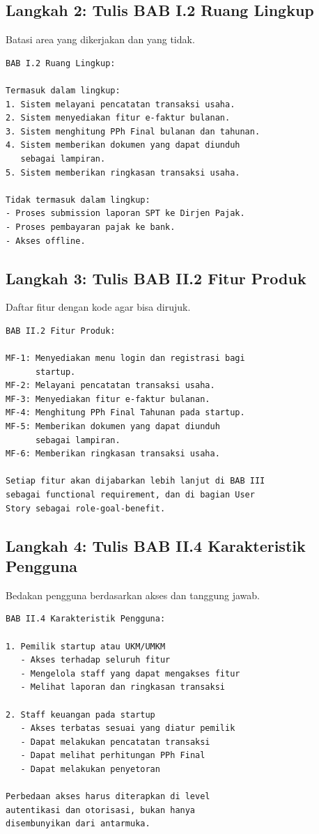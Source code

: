 \documentclass[11pt,a4paper]{article}
\begin{document}
\subsection{Langkah 2: Tulis BAB I.2 Ruang Lingkup}

Batasi area yang dikerjakan dan yang tidak.

\begin{lstlisting}[style=out]
BAB I.2 Ruang Lingkup:

Termasuk dalam lingkup:
1. Sistem melayani pencatatan transaksi usaha.
2. Sistem menyediakan fitur e-faktur bulanan.
3. Sistem menghitung PPh Final bulanan dan tahunan.
4. Sistem memberikan dokumen yang dapat diunduh
   sebagai lampiran.
5. Sistem memberikan ringkasan transaksi usaha.

Tidak termasuk dalam lingkup:
- Proses submission laporan SPT ke Dirjen Pajak.
- Proses pembayaran pajak ke bank.
- Akses offline.
\end{lstlisting}

\subsection{Langkah 3: Tulis BAB II.2 Fitur Produk}

Daftar fitur dengan kode agar bisa dirujuk.

\begin{lstlisting}[style=out]
BAB II.2 Fitur Produk:

MF-1: Menyediakan menu login dan registrasi bagi
      startup.
MF-2: Melayani pencatatan transaksi usaha.
MF-3: Menyediakan fitur e-faktur bulanan.
MF-4: Menghitung PPh Final Tahunan pada startup.
MF-5: Memberikan dokumen yang dapat diunduh
      sebagai lampiran.
MF-6: Memberikan ringkasan transaksi usaha.

Setiap fitur akan dijabarkan lebih lanjut di BAB III
sebagai functional requirement, dan di bagian User
Story sebagai role-goal-benefit.
\end{lstlisting}

\subsection{Langkah 4: Tulis BAB II.4 Karakteristik Pengguna}

Bedakan pengguna berdasarkan akses dan tanggung jawab.

\begin{lstlisting}[style=out]
BAB II.4 Karakteristik Pengguna:

1. Pemilik startup atau UKM/UMKM
   - Akses terhadap seluruh fitur
   - Mengelola staff yang dapat mengakses fitur
   - Melihat laporan dan ringkasan transaksi

2. Staff keuangan pada startup
   - Akses terbatas sesuai yang diatur pemilik
   - Dapat melakukan pencatatan transaksi
   - Dapat melihat perhitungan PPh Final
   - Dapat melakukan penyetoran

Perbedaan akses harus diterapkan di level
autentikasi dan otorisasi, bukan hanya
disembunyikan dari antarmuka.
\end{lstlisting}
\end{document}
